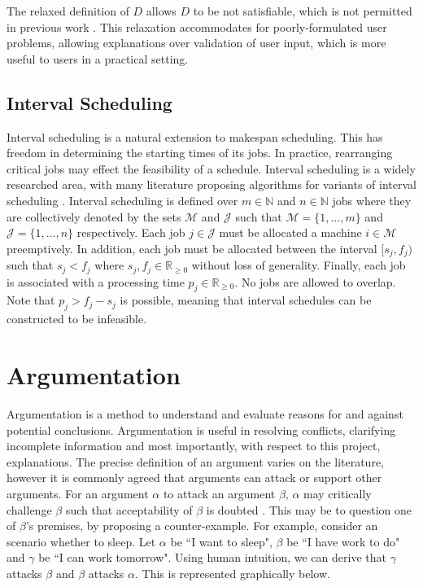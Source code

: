 The relaxed definition of $D$ allows $D$ to be not satisfiable, which is not permitted in previous work \cite{aes}. This relaxation accommodates for poorly-formulated user problems, allowing explanations over validation of user input, which is more useful to users in a practical setting.

\subsection{Interval Scheduling}

Interval scheduling is a natural extension to makespan scheduling. This has freedom in determining the starting times of its jobs. In practice, rearranging critical jobs may effect the feasibility of a schedule. Interval scheduling is a widely researched area, with many literature proposing algorithms for variants of interval scheduling \cite{is}.
\linespace
Interval scheduling is defined over $m\in\mathbb{N}$ and $n\in\mathbb{N}$ jobs where they are collectively denoted by the sets $\mathcal{M}$ and $\mathcal{J}$ such that $\mathcal{M}=\{1,...,m\}$ and $\mathcal{J}=\{1,...,n\}$ respectively. Each job $j\in\mathcal{J}$ must be allocated a machine $i\in\mathcal{M}$ preemptively. In addition, each job must be allocated between the interval $[s_j,f_j)$ such that $s_j<f_j$ where $s_j,f_j\in\mathbb{R}_{\geq 0}$ without loss of generality. Finally, each job is associated with a processing time $p_j\in\mathbb{R}_{\geq 0}$. No jobs are allowed to overlap. Note that $p_j>f_j-s_j$ is possible, meaning that interval schedules can be constructed to be infeasible.

\section{Argumentation}

Argumentation is a method to understand and evaluate reasons for and against potential conclusions. Argumentation is useful in resolving conflicts, clarifying incomplete information and most importantly, with respect to this project, explanations. The precise definition of an argument varies on the literature, however it is commonly agreed that arguments can attack or support other arguments. For an argument $\alpha$ to attack an argument $\beta$, $\alpha$ may critically challenge $\beta$ such that acceptability of $\beta$ is doubted \cite{at}. This may be to question one of $\beta$'s premises, by proposing a counter-example. For example, consider an scenario whether to sleep. Let $\alpha$ be ``I want to sleep", $\beta$ be ``I have work to do" and $\gamma$ be ``I can work tomorrow". Using human intuition, we can derive that $\gamma$ attacks $\beta$ and $\beta$ attacks $\alpha$. This is represented graphically below.

